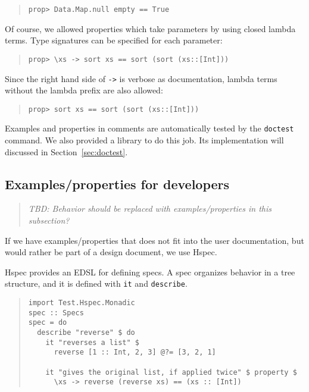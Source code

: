 \documentclass[preprint]{sigplanconf}
\newcommand{\hspec}{Hspec}
\begin{document}
\begin{quote}
\small
\begin{verbatim}
prop> Data.Map.null empty == True
\end{verbatim}
\end{quote}

\noindent Of course, we allowed properties which take parameters by
using closed lambda terms.
Type signatures can be specified for each parameter:

\begin{quote}
\small
\begin{verbatim}
prop> \xs -> sort xs == sort (sort (xs::[Int]))
\end{verbatim}
\end{quote}

\noindent Since the right hand side of {\tt ->} is verbose as documentation,
lambda terms without the lambda prefix are also allowed:

\begin{quote}
\small
\begin{verbatim}
prop> sort xs == sort (sort (xs::[Int]))
\end{verbatim}
\end{quote}

Examples and properties in comments are automatically
tested by the {\tt doctest} command. We also provided a library
to do this job. Its implementation will discussed in Section~\ref{sec:doctest}.

\subsection{Examples/properties for developers}
\label{sec:for-developers}

\begin{quote}
    \emph{TBD: Behavior should be replaced with examples/properties in this subsection?}
\end{quote}

If we have examples/properties that does not fit into the user documentation, but
would rather be part of a design document, we use \hspec{}.

\hspec{} provides an EDSL for defining specs.  A spec organizes behavior in a
tree structure, and it is defined with \texttt{it} and \texttt{describe}.

\begin{quote}
\small
\begin{verbatim}
import Test.Hspec.Monadic
spec :: Specs
spec = do
  describe "reverse" $ do
    it "reverses a list" $
      reverse [1 :: Int, 2, 3] @?= [3, 2, 1]

    it "gives the original list, if applied twice" $ property $
      \xs -> reverse (reverse xs) == (xs :: [Int])
\end{verbatim}
\end{quote}
\end{document}
